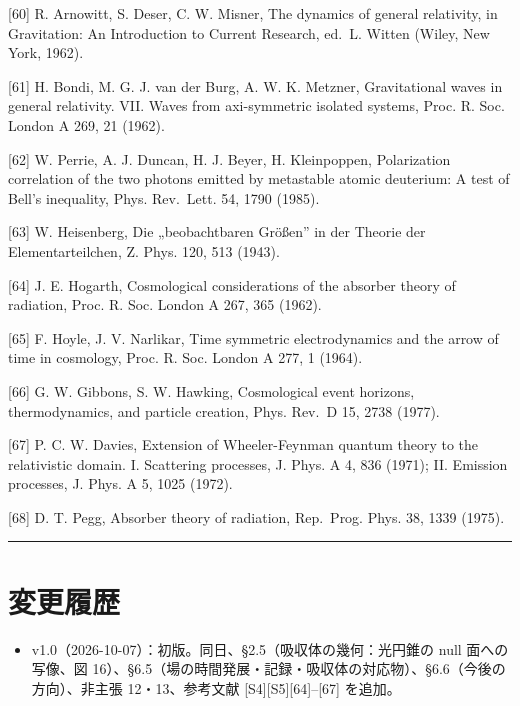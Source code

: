 \documentclass[
  a4paper,
]{ltjsarticle}
\providecommand{\tightlist}{%
  \setlength{\itemsep}{0pt}\setlength{\parskip}{0pt}}
\begin{document}
{[}60{]} R. Arnowitt, S. Deser, C. W. Misner, The dynamics of general
relativity, in Gravitation: An Introduction to Current Research, ed.~L.
Witten (Wiley, New York, 1962).

{[}61{]} H. Bondi, M. G. J. van der Burg, A. W. K. Metzner,
Gravitational waves in general relativity. VII. Waves from axi-symmetric
isolated systems, Proc. R. Soc. London A 269, 21 (1962).

{[}62{]} W. Perrie, A. J. Duncan, H. J. Beyer, H. Kleinpoppen,
Polarization correlation of the two photons emitted by metastable atomic
deuterium: A test of Bell's inequality, Phys. Rev.~Lett. 54, 1790
(1985).

{[}63{]} W. Heisenberg, Die „beobachtbaren Größen'' in der Theorie der
Elementarteilchen, Z. Phys. 120, 513 (1943).

{[}64{]} J. E. Hogarth, Cosmological considerations of the absorber
theory of radiation, Proc. R. Soc. London A 267, 365 (1962).

{[}65{]} F. Hoyle, J. V. Narlikar, Time symmetric electrodynamics and
the arrow of time in cosmology, Proc. R. Soc. London A 277, 1 (1964).

{[}66{]} G. W. Gibbons, S. W. Hawking, Cosmological event horizons,
thermodynamics, and particle creation, Phys. Rev.~D 15, 2738 (1977).

{[}67{]} P. C. W. Davies, Extension of Wheeler-Feynman quantum theory to
the relativistic domain. I. Scattering processes, J. Phys. A 4, 836
(1971); II. Emission processes, J. Phys. A 5, 1025 (1972).

{[}68{]} D. T. Pegg, Absorber theory of radiation, Rep.~Prog. Phys. 38,
1339 (1975).

\begin{center}\rule{0.5\linewidth}{0.5pt}\end{center}

\section{変更履歴}\label{ux5909ux66f4ux5c65ux6b74}

\begin{itemize}
\tightlist
\item
  v1.0（2026-10-07）：初版。同日、§2.5（吸収体の幾何：光円錐の null
  面への写像、図
  16）、§6.5（場の時間発展・記録・吸収体の対応物）、§6.6（今後の方向）、非主張
  12・13、参考文献 {[}S4{]}{[}S5{]}{[}64{]}--{[}67{]} を追加。
\end{itemize}
\end{document}
